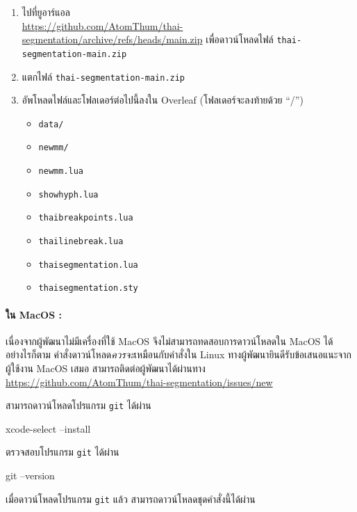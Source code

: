 \begin{enumerate}
  \item ไปที่ยูอาร์แอล \\
        \url{https://github.com/AtomThum/thai-segmentation/archive/refs/heads/main.zip}
        เพื่อดาวน์โหลดไฟล์ \texttt{thai-segmentation-main.zip}
  \item แตกไฟล์ \texttt{thai-segmentation-main.zip}
  \item อัพโหลดไฟล์และโฟลเดอร์ต่อไปนี้ลงใน Overleaf (โฟลเดอร์จะลงท้ายด้วย
        \enquote{/})
        \begin{itemize}
          \item \texttt{data/}
          \item \texttt{newmm/}
          \item \texttt{newmm.lua}
          \item \texttt{show\textunderscore hyph.lua}
          \item \texttt{thai\textunderscore breakpoints.lua}
          \item \texttt{thai\textunderscore linebreak.lua}
          \item \texttt{thai\textunderscore segmentation.lua}
          \item \texttt{thai\textunderscore segmentation.sty}
        \end{itemize}
\end{enumerate}

\paragraph{ใน MacOS :}

เนื่องจากผู้พัฒนาไม่มีเครื่องที่ใช้ MacOS จึงไม่สามารถทดสอบการดาวน์โหลดใน MacOS
ได้ อย่างไรก็ตาม คำสั่งดาวน์โหลด\emph{ควรจะ}เหมือนกับคำสั่งใน Linux
ทางผู้พัฒนายินดีรับข้อเสนอแนะจากผู้ใช้งาน MacOS เสมอ
สามารถติดต่อผู้พัฒนาได้ผ่านทาง
\url{https://github.com/AtomThum/thai-segmentation/issues/new}

สามารถดาวน์โหลดโปรแกรม \texttt{git} ได้ผ่าน

\begin{bashsource}{}
xcode-select --install
\end{bashsource}

ตรวจสอบโปรแกรม \texttt{git} ได้ผ่าน

\begin{bashsource}{}
git --version
\end{bashsource}

เมื่อดาวน์โหลดโปรแกรม \texttt{git} แล้ว สามารถดาวน์โหลดชุดคำสั่งนี้ได้ผ่าน

